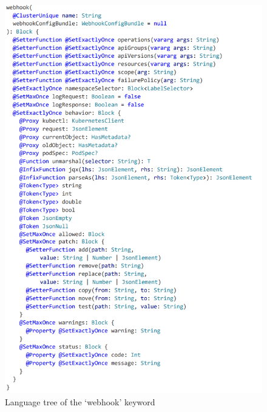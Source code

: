 \begin{figure}[h]
  \centering
  \includegraphics[width=150mm, keepaspectratio]{tree_3.png}
  \caption{Language tree of the `webhook' keyword}
  \label{fig:fltree_3}
\end{figure}

